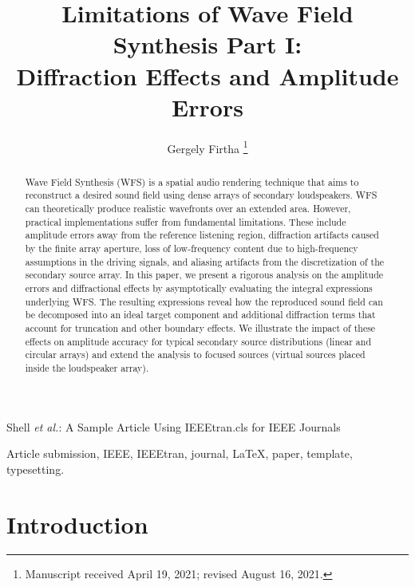 \documentclass[lettersize,journal]{IEEEtran}
\begin{document}
\title{Limitations of Wave Field Synthesis Part I:\\Diffraction Effects and Amplitude Errors}

\author{Gergely Firtha
\thanks{Manuscript received April 19, 2021; revised August 16, 2021.}}


%
{Shell \MakeLowercase{\textit{et al.}}: A Sample Article Using IEEEtran.cls for IEEE Journals}


\maketitle

\begin{abstract}
  Wave Field Synthesis (WFS) is a spatial audio rendering technique that aims to reconstruct a desired sound field using dense arrays of secondary loudspeakers. 
  WFS can theoretically produce realistic wavefronts over an extended area.
  However, practical implementations suffer from fundamental limitations. 
  These include amplitude errors away from the reference listening region, diffraction artifacts caused by the finite array aperture, loss of low-frequency content due to high-frequency assumptions in the driving signals, and aliasing artifacts from the discretization of the secondary source array.
  In this paper, we present a rigorous analysis on the amplitude errors and diffractional effects by asymptotically evaluating the integral expressions underlying WFS. 
  The resulting expressions reveal how the reproduced sound field can be decomposed into an ideal target component and additional diffraction terms that account for truncation and other boundary effects.
   We illustrate the impact of these effects on amplitude accuracy for typical secondary source distributions (linear and circular arrays) and extend the analysis to focused sources (virtual sources placed inside the loudspeaker array). 
   \end{abstract}


\begin{IEEEkeywords}
Article submission, IEEE, IEEEtran, journal, \LaTeX, paper, template, typesetting.
\end{IEEEkeywords}

\section{Introduction}
\end{document}
